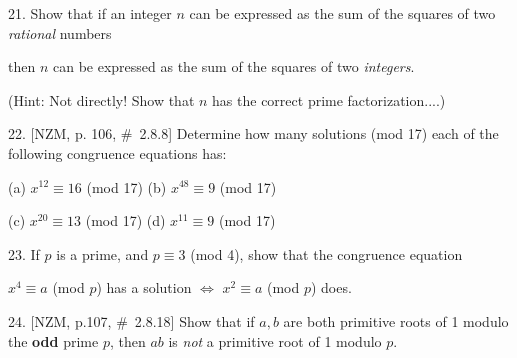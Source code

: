 

\ctln{\centerline}
\ssk{\smallskip}
\msk{\medskip}
\bsk{\bigskip}

\overfullrule=0pt
\nopagenumbers




\msk


\bsk

\item{21.} Show that if an integer $n$ can be expressed as the sum of the squares of two {\it rational} numbers

\ssk


\ssk

\item{} then $n$ can be expressed as the sum of the squares of two {\it integers}.

\msk

\item{} (Hint: Not directly! Show that $n$ has the correct prime factorization....)

\bsk

\item{22.} [NZM, p. 106, \#\ 2.8.8] Determine how many solutions (mod 17) each of the following 
congruence equations has:

\msk

\hskip1in (a) $x^{12}\equiv 16$ (mod 17) \hskip1in (b) $x^{48}\equiv 9$ (mod 17)

\ssk


\hskip1in (c) $x^{20}\equiv 13$ (mod 17) \hskip1in (d) $x^{11}\equiv 9$ (mod 17)


\bsk

\item{23.}  If $p$ is a prime, and $p\equiv 3$ (mod 4), show that the congruence equation

\ssk

\item{} $x^4\equiv a$ (mod $p$) has a solution $\Leftrightarrow$ $x^2\equiv a$ (mod $p$) does.


\bsk

\item{24.} [NZM, p.107, \#\ 2.8.18] Show that if $a,b$ are both primitive roots of 1 modulo the {\bf odd}
prime $p$, then $ab$ is {\it not} a primitive root of 1 modulo $p$.

